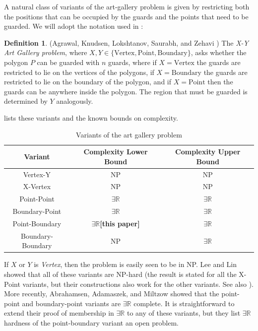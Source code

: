 \documentclass[11pt]{article}
\newcommand{\rr}{\mathbb R}
\theoremstyle{plain}
\theoremstyle{definition}
\newtheorem{definition}[theorem]{Definition}
\numberwithin{theorem}{section}
\begin{document}
A natural class of variants of the art-gallery problem is given by restricting both the positions that can be occupied by the guards and the points that need to be guarded. We will adopt the notation used in \cite{AlmostConvex}:

\begin{definition}
(Agrawal, Knudsen, Lokshtanov, Saurabh, and Zehavi \cite{AlmostConvex}) The \emph{X-Y Art Gallery problem}, where $X, Y\in \{\text{Vertex}, \text{Point}, \text{Boundary}\}$, asks whether the polygon $P$ can be guarded with $n$ guards, where if $X=\text{Vertex}$ the guards are restricted to lie on the vertices of the polygons, if $X=\text{Boundary}$ the guards are restricted to lie on the boundary of the polygon, and if $X=\text{Point}$ then the guards can be anywhere inside the polygon. The region that must be guarded is determined by $Y$ analogously.
\end{definition}

 lists these variants and the known bounds on complexity.

\begin{table}[ht]
\begin{center}
\begin{tabu}{|c|c|c|}
\hline
Variant&Complexity Lower Bound&Complexity Upper Bound\\
\hline
Vertex-Y&NP\cite{NPHardness}&NP\\
X-Vertex&NP\cite{NPHardness}&NP\\
Point-Point&$\exists\rr$\cite{ExistsRHardness}&$\exists\rr$\cite{ExistsRHardness}\\
Boundary-Point&$\exists\rr$\cite{ExistsRHardness}&$\exists\rr$\cite{ExistsRHardness}\\
Point-Boundary&$\mathbf{\exists\rr}${\bf [this paper]}&$\exists\rr$\cite{ExistsRHardness}\\
Boundary-Boundary&NP\cite{NPHardness}&$\exists\rr$\cite{ExistsRHardness}\\
\hline
\end{tabu}
\caption{Variants of the art gallery problem}
\label{tab:InitialsTable}
\end{center}
\end{table}

If $X$ or $Y$ is \emph{Vertex}, then the problem is easily seen to be in NP. Lee and Lin \cite{NPHardness} showed that all of these variants are NP-hard (the result is stated for all the X-Point variants, but their constructions also work for the other variants. See also \cite{BoundaryNPHard}). More recently, Abrahamsen, Adamaszek, and Miltzow \cite{ExistsRHardness} showed that the point-point and boundary-point variants are $\exists\rr$ complete. It is straightforward to extend their proof of membership in $\exists\rr$ to any of these variants, but they list $\exists\rr$ hardness of the point-boundary variant an open problem.
\end{document}
